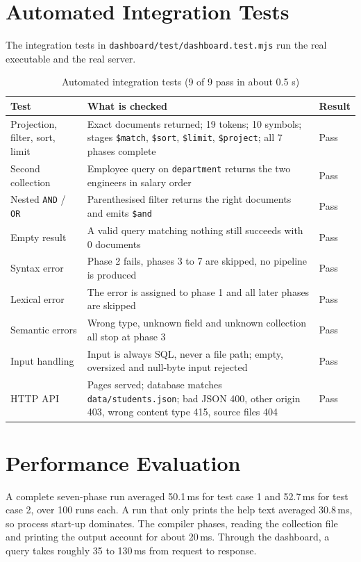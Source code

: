 \documentclass[12pt,a4paper]{report}
\newcommand{\codeus}{\textunderscore\allowbreak}
\DeclareRobustCommand{\code}[1]{\texttt{\let\_\codeus #1}}
\begin{document}
\section{Automated Integration Tests}
The integration tests in \code{dashboard/test/dashboard.test.mjs} run the real executable and the real server.
\begin{table}[H]
\centering\footnotesize
\begin{tabularx}{\linewidth}{|P{3.4cm}|L|P{1.0cm}|}
\hline
\textbf{Test} & \textbf{What is checked} & \textbf{Result} \\ \hline
Projection, filter, sort, limit & Exact documents returned; 19 tokens; 10 symbols; stages \code{\$match}, \code{\$sort}, \code{\$limit}, \code{\$project}; all 7 phases complete & Pass \\ \hline
Second collection & Employee query on \code{department} returns the two engineers in salary order & Pass \\ \hline
Nested \code{AND} / \code{OR} & Parenthesised filter returns the right documents and emits \code{\$and} & Pass \\ \hline
Empty result & A valid query matching nothing still succeeds with 0 documents & Pass \\ \hline
Syntax error & Phase 2 fails, phases 3 to 7 are skipped, no pipeline is produced & Pass \\ \hline
Lexical error & The error is assigned to phase 1 and all later phases are skipped & Pass \\ \hline
Semantic errors & Wrong type, unknown field and unknown collection all stop at phase 3 & Pass \\ \hline
Input handling & Input is always SQL, never a file path; empty, oversized and null-byte input rejected & Pass \\ \hline
HTTP API & Pages served; database matches \code{data/students.json}; bad JSON 400, other origin 403, wrong content type 415, source files 404 & Pass \\ \hline
\end{tabularx}
\caption{Automated integration tests (9 of 9 pass in about 0.5 s)}
\label{tab:integration}
\end{table}

\section{Performance Evaluation}
A complete seven-phase run averaged 50.1\,ms for test case 1 and 52.7\,ms for test case 2, over 100 runs each. A run that only prints the help text averaged 30.8\,ms, so process start-up dominates. The compiler phases, reading the collection file and printing the output account for about 20\,ms. Through the dashboard, a query takes roughly 35 to 130\,ms from request to response.
\end{document}

